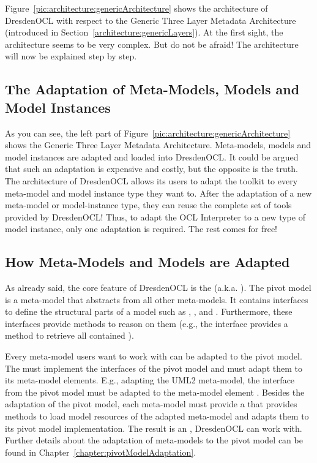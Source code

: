 Figure~\ref{pic:architecture:genericArchitecture} shows the architecture of 
DresdenOCL with respect to the Generic Three Layer Metadata Architecture
(introduced in Section~\ref{architecture:genericLayers}). At the first sight, 
the architecture seems to be very complex. But do not be afraid! The 
architecture will now be explained step by step.


\subsection{The Adaptation of Meta-Models, Models and Model Instances}

As you can see, the left part of 
Figure~\ref{pic:architecture:genericArchitecture} shows the Generic Three Layer
Metadata Architecture. Meta-models, models and model instances are adapted and 
loaded into DresdenOCL. It could be argued that such an adaptation is expensive
and costly, but the opposite is the truth. The architecture of DresdenOCL allows
its users to adapt the toolkit to every meta-model and model instance type they 
want to. After the adaptation of a new meta-model or model-instance type, they
can reuse the complete set of tools provided by DresdenOCL! Thus,
to adapt the \acs{OCL} Interpreter to a new type of model instance, only one 
adaptation is required. The rest comes for free!


\subsection{How Meta-Models and Models are Adapted}
\label{architecture:metaModelAdaptation}

As already said, the core feature of DresdenOCL is the 
(a.k.a. ). The pivot model is a meta-model that abstracts
from all other meta-models. It contains interfaces to define the structural 
parts of a model such as
, ,  and . 
Furthermore, these interfaces provide methods to reason on them (e.g., the 
interface  provides a method  to 
retrieve all contained ).

Every meta-model users want to work with can be adapted to the pivot model. The
 must implement the interfaces of the pivot model 
and must adapt them to its meta-model elements. E.g., adapting the \acs{UML}2 
meta-model, the interface  from the pivot model must be adapted to 
the meta-model element . Besides the adaptation of the pivot 
model, each meta-model must provide a  that provides 
methods to load model resources of the adapted meta-model and adapts them to 
its pivot model implementation. The result is an ,
DresdenOCL can work with. Further details about the adaptation of meta-models to
the pivot model can be found in Chapter~\ref{chapter:pivotModelAdaptation}.


